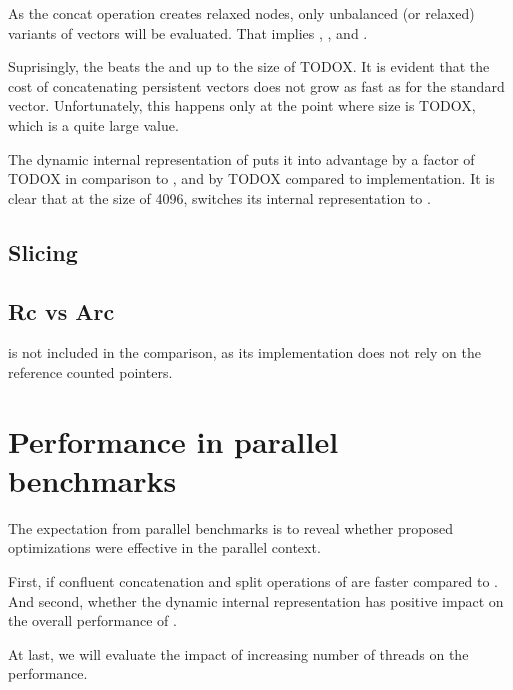 As the concat operation creates relaxed nodes, only unbalanced (or relaxed) variants of vectors will be evaluated. That implies \stdvec{}, \imrsvec{}, \rrbvec{} and \pvec{}. 

Suprisingly, the \stdvec{} beats the \rrbvec{} and \imrsvec up to the size of TODOX. It is evident that the cost of concatenating persistent vectors does not grow as fast as for the standard vector. Unfortunately, this happens only at the point where size is TODOX, which is a quite large value. 

The dynamic internal representation of \pvec{} puts it into advantage by a factor of TODOX in comparison to \rrbvec{}, and by TODOX compared to \imrsvec{} implementation. It is clear that at the size of 4096, \pvec{} switches its internal representation to \rrbvec{}. 


\subsection{Slicing}

\subsection{Rc vs Arc}
\label{sec:perf-rc-vs-arc}
\stdvec{} is not included in the comparison, as its implementation does not rely on the reference counted pointers. 

\section{Performance in parallel benchmarks}
\label{sec:perf-par}

The expectation from parallel benchmarks is to reveal whether proposed optimizations were effective in the parallel context. 

First, if confluent concatenation and split operations of \rrbvec{} are faster compared to \rbvec{}. And second, whether the dynamic internal representation has positive impact on the overall performance of \pvec{}. 

At last, we will evaluate the impact of increasing number of threads on the performance. 


